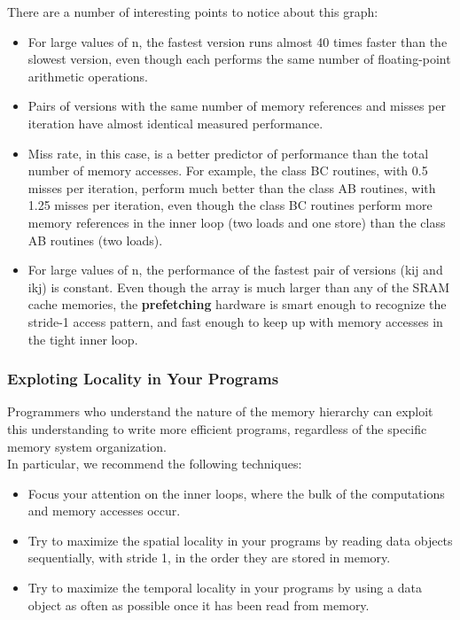 \documentclass[11pt]{article}
\begin{document}
There are a number of interesting points to notice about this graph:\\
\begin{itemize}
\item For large values of n, the fastest version runs almost 40 times faster than the slowest version, even though each performs the same number of floating-point arithmetic operations.\\
\item Pairs of versions with the same number of memory references and misses per iteration have almost identical measured performance.\\
\item Miss rate, in this case, is a better predictor of performance than the total number of memory accesses. For example, the class BC routines, with 0.5 misses per iteration, perform much better than the class AB routines, with 1.25 misses per iteration, even though the class BC routines perform more memory references in the inner loop (two loads and one store) than the class AB routines (two loads).\\
\item For large values of n, the performance of the fastest pair of versions (kij and ikj) is constant. Even though the array is much larger than any of the SRAM cache memories, the \textbf{prefetching} hardware is smart enough to recognize the stride-1 access pattern, and fast enough to keep up with memory accesses in the tight inner loop.\\
\end{itemize}


\subsubsection{Exploting Locality in Your Programs}
\label{sec:org4439f36}
Programmers who understand the nature of the memory hierarchy can exploit this understanding to write more efficient programs, regardless of the specific memory system organization.\\

In particular, we recommend the following techniques:\\
\begin{itemize}
\item Focus your attention on the inner loops, where the bulk of the computations and memory accesses occur.\\
\item Try to maximize the spatial locality in your programs by reading data objects sequentially, with stride 1, in the order they are stored in memory.\\
\item Try to maximize the temporal locality in your programs by using a data object as often as possible once it has been read from memory.\\
\end{itemize}
\end{document}
